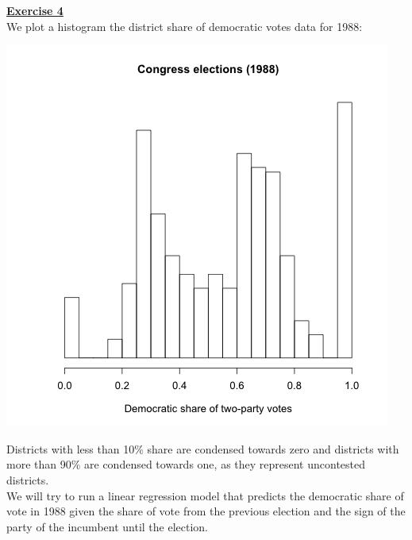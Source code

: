 \documentclass[a4paper, 11pt]{article}
\begin{document}
\newpage
\textbf{\underline{Exercise 4}}\\
\newline We plot a histogram the district share of democratic votes data for 1988:
\begin{center}
\includegraphics[scale=0.5]{plot_ex4_1.png}
\end{center}
Districts with less than 10\% share are condensed towards zero and districts with more than 90\% are condensed towards one, as they represent uncontested districts.\\
\newline We will try to run a linear regression model that predicts the democratic share of vote in 1988 given the share of vote from the previous election and the sign of the party of the incumbent until the election.
\end{document}
